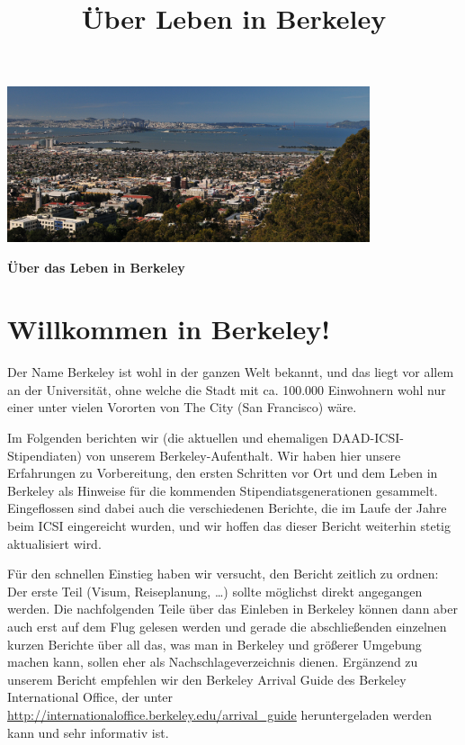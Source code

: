 \documentclass[a4paper]{scrreprt}
\begin{document}
\title{Über Leben in Berkeley}

\begin{center}

\vspace{0.4\textwidth}
\includegraphics[width=0.8\textwidth]{img/berkeley_cropped.jpg}

\vspace{0.1\textwidth}

\Huge{\textbf{Über das Leben in Berkeley}}

\end{center}

\newpage

\section*{Willkommen in Berkeley!}

Der Name Berkeley ist wohl in der ganzen Welt bekannt, und das liegt vor allem an der Universität, 
ohne welche die Stadt mit ca. 100.000 Einwohnern wohl nur einer unter vielen Vororten von The City (San Francisco) wäre.

Im Folgenden berichten wir (die aktuellen und ehemaligen DAAD-ICSI-Stipendiaten) von unserem Berkeley-Aufenthalt.
Wir haben hier unsere Erfahrungen zu Vorbereitung, den ersten Schritten vor Ort und dem Leben in Berkeley
als Hinweise für die kommenden Stipendiatsgenerationen gesammelt.
Eingeflossen sind dabei auch die verschiedenen Berichte,
die im Laufe der Jahre beim ICSI eingereicht wurden,
und wir hoffen das dieser Bericht weiterhin stetig aktualisiert wird.

Für den schnellen Einstieg haben wir versucht, den Bericht zeitlich zu ordnen: 
Der erste Teil (Visum, Reiseplanung, \ldots) sollte möglichst direkt angegangen werden.
Die nachfolgenden Teile über das Einleben in Berkeley können dann aber auch erst auf dem Flug gelesen werden
und gerade die abschließenden einzelnen kurzen Berichte über all das, was man in Berkeley
und größerer Umgebung machen kann, sollen eher als Nachschlageverzeichnis dienen.
Ergänzend zu unserem Bericht empfehlen wir den Berkeley Arrival Guide des Berkeley International Office,
der unter \url{http://internationaloffice.berkeley.edu/arrival_guide} heruntergeladen werden kann
und sehr informativ ist.
\end{document}
